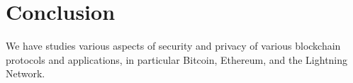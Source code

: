 \chapter{Conclusion}

\label{Chapter13Conclusion}

We have studies various aspects of security and privacy of various blockchain protocols and applications, in particular Bitcoin, Ethereum, and the Lightning Network.

